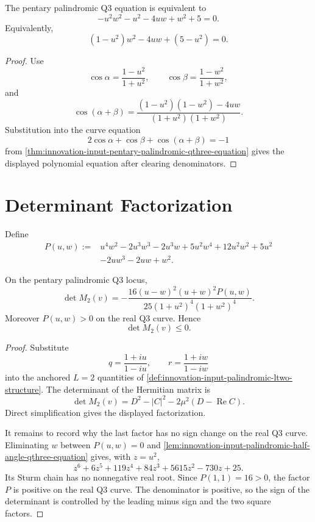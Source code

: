 \begin{lemma}
\label{lem:innovation-input-palindromic-half-angle-qthree-equation}
The pentary palindromic Q3 equation is equivalent to
$$
-u^2w^2-u^2-4uw+w^2+5=0.
$$
Equivalently,
$$
(1-u^2)w^2-4uw+(5-u^2)=0.
$$
\end{lemma}

\begin{proof}
Use
$$
\cos\alpha=\frac{1-u^2}{1+u^2},
\qquad
\cos\beta=\frac{1-w^2}{1+w^2},
$$
and
$$
\cos(\alpha+\beta)
=
\frac{(1-u^2)(1-w^2)-4uw}{(1+u^2)(1+w^2)}.
$$
Substitution into the curve equation
$$
2\cos\alpha+\cos\beta+\cos(\alpha+\beta)=-1
$$
from
\autoref{thm:innovation-input-pentary-palindromic-qthree-equation}
gives the displayed polynomial equation after clearing denominators.
\end{proof}

\section{Determinant Factorization}
\label{sec:innovation-input-palindromic-determinant-factorization}

\begin{definition}
\label{def:innovation-input-palindromic-determinant-numerator}
Define
$$
\begin{aligned}
P(u,w):={}&u^4w^2-2u^3w^3-2u^3w
+5u^2w^4+12u^2w^2+5u^2\\
&-2uw^3-2uw+w^2.
\end{aligned}
$$
\end{definition}

\begin{theorem}[Anchored $L=2$ determinant factorization]
\label{thm:innovation-input-palindromic-ltwo-determinant-factorization}
On the pentary palindromic Q3 locus,
$$
\det M_2(v)
=
-
\frac{
16(u-w)^2(u+w)^2P(u,w)
}{
25(1+u^2)^4(1+w^2)^4
}.
$$
Moreover $P(u,w)>0$ on the real Q3 curve. Hence
$$
\det M_2(v)\le0.
$$
\end{theorem}

\begin{proof}
Substitute
$$
q=\frac{1+iu}{1-iu},
\qquad
r=\frac{1+iw}{1-iw}
$$
into the anchored $L=2$ quantities of
\autoref{def:innovation-input-palindromic-ltwo-structure}. The determinant
of the Hermitian matrix is
$$
\det M_2(v)
=
D^2-|C|^2-2\mu^2(D-\operatorname{Re}C).
$$
Direct simplification gives the displayed factorization.

It remains to record why the last factor has no sign change on the real
Q3 curve. Eliminating $w$ between $P(u,w)=0$ and
\autoref{lem:innovation-input-palindromic-half-angle-qthree-equation}
gives, with $z=u^2$,
$$
z^6+6z^5+119z^4+84z^3+5615z^2-730z+25.
$$
Its Sturm chain has no nonnegative real root. Since $P(1,1)=16>0$, the
factor $P$ is positive on the real Q3 curve. The denominator is positive,
so the sign of the determinant is controlled by the leading minus sign
and the two square factors.
\end{proof}

